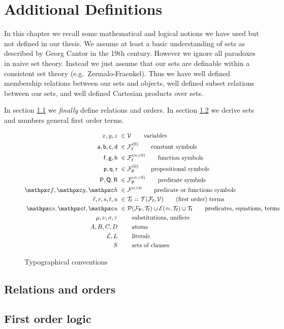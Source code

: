 
\chapter{Additional Definitions}





In this chapter we recall some mathematical and logical notions we have used but not defined in our thesis.
We assume at least a {\myem basic} understanding of sets as described by Georg Cantor in the 19th century. 
However we ignore all paradoxes in {\myem naive} set theory.
Instead we just assume that our sets are definable within a consistent set theory (e.g.~Zermalo-Fraenkel).
Thus we have well defined {\myem membership} relations between our sets and objects,
well defined {\myem subset} relations between our sets, 
and well defined {\myem Cartesian products} over sets.

In section \ref{sec:app:maths} we {\em finally} define {\myem relations} and {\myem orders}. 
In section \ref{sec:app:fol} we derive sets and numbers general first order terms.

\begin{figure}[hbt]\label{fig:conventions}
	\begin{align*}
	x,y,z &\ \in\mcV \tag*{variables} \\
	\ma,\mb,\mc,\md &\ \in\mcFfn[{0}]\tag*{constant symbols} \\
	\mf, \mg, \mh &\ \in\mcFfn[{n>0}]\tag*{function symbols} \\
	\mpp, \mq, \mr &\ \in\mcFPn[{0}]\tag*{propositional symbols}\\
	\mP, \mQ, \mR &\ \in\mcFPn[{n>0}]\tag*{predicate symbols}\\
	\mcf, \mcg, \mch &\ \in\mcF^{n>0} \tag*{predicate or functions symbols}\\
	\ell, r, s,t,u &\ \in\mcTf = \mcTFfV\tag*{(first order) terms}\\
	\mcs, \mct, \mcu &\ \in \mcPT \cup \mcET \cup \mcTf \tag*{predicates, equations, terms}\\
	\mu, \nu, \sigma, \tau &\ \tag*{substitutions, unifiers}\\
	A,B,C,D &\ \tag*{atoms} \\
	\mcL, L &\ \tag*{literals} \\
	S &\ \tag*{sets of clauses}
	\end{align*}
	\caption{Typographical conventions}
\end{figure}

\section{Relations and orders}\label{sec:app:maths}



\section{First order logic}\label{sec:app:fol}







